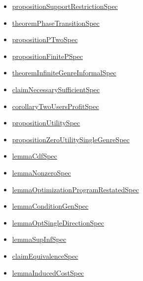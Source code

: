 \documentclass[10pt]{article}
\begin{document}
\begin{itemize}[leftmargin=1.2em]
\begin{itemize}[leftmargin=1.2em]
\item \hyperlink{source-claim-f35165b0b369f79c}{proposition\allowbreak{}Support\allowbreak{}Restriction\allowbreak{}Spec}
\item \hyperlink{source-claim-b014d48b1f280b37}{theorem\allowbreak{}Phase\allowbreak{}Transition\allowbreak{}Spec}
\item \hyperlink{source-claim-bac13c5e10fbf065}{proposition\allowbreak{}P\allowbreak{}Two\allowbreak{}Spec}
\item \hyperlink{source-claim-32f245f5fbb8fcc5}{proposition\allowbreak{}Finite\allowbreak{}P\allowbreak{}Spec}
\item \hyperlink{source-claim-5f1111d2a96ef9c6}{theorem\allowbreak{}Infinite\allowbreak{}Genre\allowbreak{}Informal\allowbreak{}Spec}
\item \hyperlink{source-claim-7b9a422d7c8bad5a}{claim\allowbreak{}Necessary\allowbreak{}Sufficient\allowbreak{}Spec}
\item \hyperlink{source-claim-9c38879758df697d}{corollary\allowbreak{}Two\allowbreak{}Users\allowbreak{}Profit\allowbreak{}Spec}
\item \hyperlink{source-claim-eab7d2ebbe6b0e4f}{proposition\allowbreak{}Utility\allowbreak{}Spec}
\item \hyperlink{source-claim-494c398003f200f3}{proposition\allowbreak{}Zero\allowbreak{}Utility\allowbreak{}Single\allowbreak{}Genre\allowbreak{}Spec}
\item \hyperlink{source-claim-ad0a52650a7233e7}{lemma\allowbreak{}Cdf\allowbreak{}Spec}
\item \hyperlink{source-claim-38c3fa48991f49d3}{lemma\allowbreak{}Nonzero\allowbreak{}Spec}
\item \hyperlink{source-claim-ff0a0ac447070dc4}{lemma\allowbreak{}Optimization\allowbreak{}Program\allowbreak{}Restated\allowbreak{}Spec}
\item \hyperlink{source-claim-39baad948341889c}{lemma\allowbreak{}Condition\allowbreak{}Gen\allowbreak{}Spec}
\item \hyperlink{source-claim-b91906e2d87f0528}{lemma\allowbreak{}Opt\allowbreak{}Single\allowbreak{}Direction\allowbreak{}Spec}
\item \hyperlink{source-claim-e310b935c96ac006}{lemma\allowbreak{}Sup\allowbreak{}Inf\allowbreak{}Spec}
\item \hyperlink{source-claim-c369fc48e6142226}{claim\allowbreak{}Equivalence\allowbreak{}Spec}
\item \hyperlink{source-claim-9a018edf30caf4d9}{lemma\allowbreak{}Induced\allowbreak{}Cost\allowbreak{}Spec}

\end{itemize}
\end{itemize}
\end{document}
